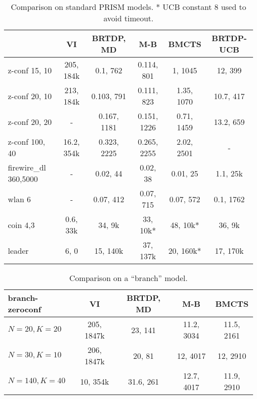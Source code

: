 \begin{landscape}

\begin{table}
\begin{tabularx}{\textwidth}{ l | C | C | C | C | C}
    \hline
                          & VI           &  BRTDP, MD     & M-B            & BMCTS       & BRTDP-UCB       \\
    \hline
    z-conf 15, 10         & 205, 184k    &  0.1, 762      & 0.114, 801     & 1, 1045     &  12, 399        \\
    z-conf 20, 10         & 213, 184k    &  0.103, 791    & 0.111, 823     & 1.35, 1070  &  10.7, 417      \\
    z-conf 20, 20         & -            &  0.167, 1181   & 0.151, 1226    & 0.71, 1459  &  13.2, 659      \\
    z-conf 100, 40        & 16.2, 354k   &  0.323, 2225   & 0.265, 2255    & 2.02, 2501  &  -              \\

    firewire\_dl 360,5000 & -            & 0.02, 44       & 0.02, 38       & 0.01, 25    & 1.1, 25k        \\
    wlan 6                & -            & 0.07, 412      & 0.07, 715      & 0.07, 572   & 0.1, 1762       \\
    coin 4,3              & 0.6, 33k     & 34, 9k         & 33, 10k*       & 48, 10k*    & 36, 9k          \\
    leader                & 6, 0         & 15, 140k       & 37, 137k       & 20, 160k*   & 17, 170k
\end{tabularx}
\caption{Comparison on standard PRISM models. * UCB constant 8 used to avoid timeout.}
\label{table:general_comparison}
\end{table}

\begin{table}
\begin{tabularx}{\textwidth}{ l | C | C | C | C }
\toprule
branch-zeroconf &    VI     & BRTDP, MD      & M-B            & BMCTS       \\
\midrule %
$N=20, K=20$    & 205, 1847k  & 23, 141        & 11.2, 3034     & 11.5, 2161  \\
$N=30,  K=10$   & 206, 1847k  & 20, 81         & 12, 4017       & 12, 2910    \\
$N=140,  K=40$  & 10, 354k  & 31.6, 261        & 12.7, 4017     & 11.9, 2910
\end{tabularx}
\caption{Comparison on a ``branch'' model.}
\label{table:branch_zconf}
\end{table}


\end{landscape}
